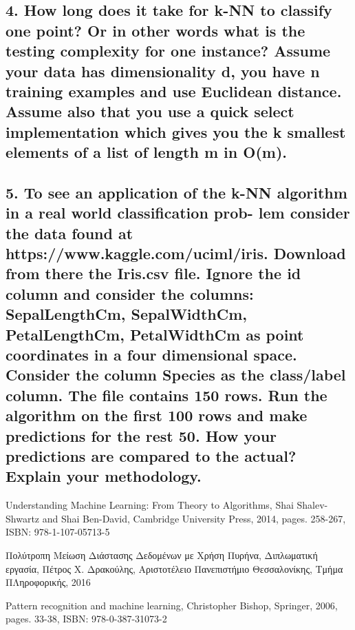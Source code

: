 \documentclass[12pt]{article}
\begin{document}
\pagebreak

\subsection*{4. How long does it take for k-NN to classify one point? Or in other words
	what is the testing complexity for one instance? Assume your data has dimensionality d, you
	have n training examples and use Euclidean distance. Assume also that you use a quick select
	implementation which gives you the k smallest elements of a list of length m in O(m).}


\pagebreak

\subsection*{5. To see an application of the k-NN algorithm in a real world classification prob-
	lem consider the data found at https://www.kaggle.com/uciml/iris. Download from there the
	Iris.csv file. Ignore the id column and consider the columns: SepalLengthCm, SepalWidthCm,
	PetalLengthCm, PetalWidthCm as point coordinates in a four dimensional space. Consider the
	column Species as the class/label column. The file contains 150 rows. Run the algorithm on
	the first 100 rows and make predictions for the rest 50. How your predictions are compared to
	the actual? Explain your methodology.}

\pagebreak

\begin{thebibliography}{9}
	Understanding Machine Learning: From Theory to Algorithms, 
	Shai Shalev-Shwartz and Shai Ben-David,
	Cambridge University Press, 2014,
	pages. 258-267, 
	ISBN: 978-1-107-05713-5
	
	Πολύτροπη Μείωση Διάστασης Δεδομένων με Χρήση Πυρήνα,
	Διπλωματική εργασία, 
	Πέτρος Χ. Δρακούλης,
	Αριστοτέλειο Πανεπιστήμιο Θεσσαλονίκης, Τμήμα ΠΛηροφορικής, 2016
	
	Pattern recognition and machine learning, 	
	Christopher Bishop,
	Springer, 2006,
	pages. 33-38, 
	ISBN: 978-0-387-31073-2
	
\end{thebibliography}
\end{document}
